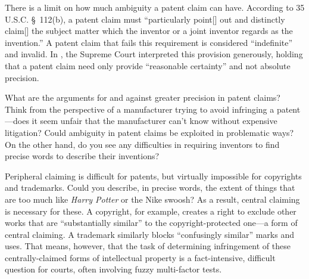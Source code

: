 
There is a limit on how much ambiguity a patent claim can have. According to 35
U.S.C. \S~112(b), a patent claim must ``particularly point[] out and distinctly
claim[] the subject matter which the inventor or a joint inventor regards as
the invention.'' A patent claim that fails this requirement is considered
``indefinite'' and invalid. In \optclause, the Supreme
Court interpreted this provision generously, holding that a patent claim need
only provide ``reasonable certainty'' and not absolute precision.

What are the arguments for and against greater precision in patent claims?
Think from the perspective of a manufacturer trying to avoid infringing a
patent---does it seem unfair that the manufacturer can't know without expensive
litigation? Could ambiguity in patent claims be exploited in problematic ways?
On the other hand, do you see any difficulties in requiring inventors to find
precise words to describe their inventions?

Peripheral claiming is difficult for patents, but virtually impossible for
copyrights and trademarks. Could you describe, in precise words, the extent of
things that are too much like \emph{Harry Potter} or the Nike swoosh? As a
result, central claiming is necessary for these. A copyright, for example,
creates a right to exclude other works that are ``substantially similar'' to the
copyright-protected one---a form of central claiming. A trademark similarly
blocks ``confusingly similar'' marks and uses. That means, however, that the
task of determining infringement of these centrally-claimed forms of
intellectual property is a fact-intensive, difficult question for courts, often
involving fuzzy multi-factor tests.


